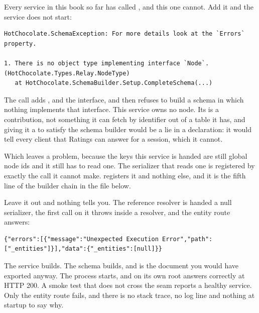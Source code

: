 %
Every service in this book so far has called
, and this one cannot. Add it and the
service does not start:

\begin{verbatim}
HotChocolate.SchemaException: For more details look at the `Errors` property.

1. There is no object type implementing interface `Node`. (HotChocolate.Types.Relay.NodeType)
   at HotChocolate.SchemaBuilder.Setup.CompleteSchema(...)
\end{verbatim}

%
The call adds ,  and the  interface, and then
refuses to build a schema in which nothing implements that interface. This
service owns no node. Its  is a contribution, not something it
can fetch by identifier out of a table it has, and giving it a
\code{[NodeResolver]} to satisfy the schema builder would be a lie in a
declaration: it would tell every client that Ratings can answer
 for a session, which it cannot.

%
Which leaves a problem, because the keys this service is handed are still
global node ids and it still has to read one. The serializer that reads one is
registered by exactly the call it cannot make. 
registers it and nothing else, and it is the fifth line of the builder chain in
the file below.

%
Leave it out and nothing tells you. The reference resolver is handed a null
serializer, the first call on it throws inside a resolver, and the entity route
answers:

\begin{verbatim}
{"errors":[{"message":"Unexpected Execution Error","path":["_entities"]}],"data":{"_entities":[null]}}
\end{verbatim}

%
The service builds. The schema builds, and is the document you would have
exported anyway. The process starts, and  on its own root
answers correctly at HTTP 200. A smoke test that does not cross the seam
reports a healthy service. Only the entity route fails, and there is no stack
trace, no log line and nothing at startup to say why.


